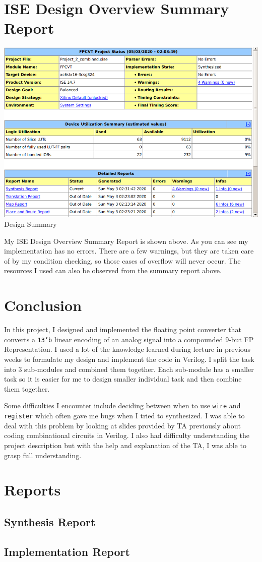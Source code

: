 \documentclass{article}
\begin{document}
\section{ISE Design Overview Summary Report}
\begin{center}
    \includegraphics[scale=0.35]{design_summary.png} \\
    \caption{Design Summary}
\end{center}
My ISE Design Overview Summary Report is shown above. As you can see my implementation has no errors. There are a few warnings, but they are taken care of by my condition checking, so those cases of overflow will never occur. The resources I used can also be observed from the summary report above. 

\section{Conclusion} 
In this project, I designed and implemented the floating point converter that converts a \texttt{13'b} linear encoding of an analog signal into a compounded 9-but FP Representation. I used a lot of the knowledge learned during lecture in previous weeks to formulate my design and implement the code in Verilog. I split the task into 3 sub-modules and combined them together. Each sub-module has a smaller task so it is easier for me to design smaller individual task and then combine them together. \par
Some difficulties I encounter include deciding between when to use \texttt{wire} and \texttt{register} which often gave me bugs when I tried to synthesized. I was able to deal with this problem by looking at slides provided by TA previously about coding combinational circuits in Verilog. I also had difficulty understanding the project description but with the help and explanation of the TA, I was able to grasp full understanding. 


\newpage
\small
\section{Reports}
\subsection{Synthesis Report}

\newpage
\subsection{Implementation Report}

\end{document}
